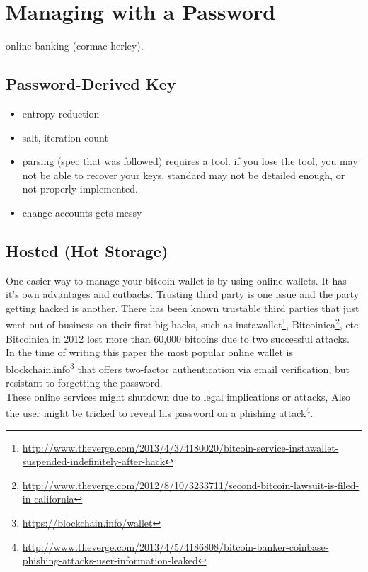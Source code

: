 
\section{Managing with a Password}

\cf online banking (cormac herley).


\subsection{Password-Derived Key} 

\begin{itemize}
  \item entropy reduction
  \item salt, iteration count
  \item parsing (spec that was followed) requires a tool. if you lose the tool, you may not be able to recover your keys. standard may not be detailed enough, or not properly implemented.
  \item change accounts gets messy
\end{itemize}


\subsection{Hosted (Hot Storage)} 
One easier way to manage your bitcoin wallet is by using online wallets. It has it's own advantages and cutbacks. Trusting third party is one issue and the party getting hacked is another. There has been known trustable third parties that just went out of business on their first big hacks, such as instawallet\footnote{\url{http://www.theverge.com/2013/4/3/4180020/bitcoin-service-instawallet-suspended-indefinitely-after-hack}}, Bitcoinica\footnote{\url{http://www.theverge.com/2012/8/10/3233711/second-bitcoin-lawsuit-is-filed-in-california}}, etc. Bitcoinica in 2012 lost more than 60,000 bitcoins due to two successful attacks.\\
In the time of writing this paper the most popular online wallet is blockchain.info\footnote{\url{https://blockchain.info/wallet}} that offers two-factor authentication via email verification, but resistant to forgetting the password.\\ These online services might shutdown due to legal implications or attacks, Also the user might be tricked to reveal his password on a phishing attack\footnote{\url{http://www.theverge.com/2013/4/5/4186808/bitcoin-banker-coinbase-phishing-attacks-user-information-leaked}}.

